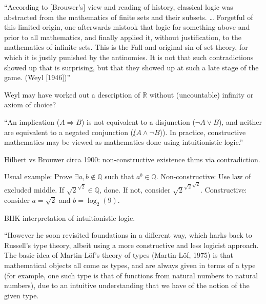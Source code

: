 ``According to [Brouwer’s] view and reading of history, 
classical logic was abstracted 
from the mathematics of finite sets and their subsets. \ldots 
Forgetful of this limited origin, 
one afterwards mistook that logic 
for something above and prior to all mathematics, 
and finally applied it, without justification, 
to the mathematics of infinite sets. 
This is the Fall and original sin of set theory, 
for which it is justly punished by the antinomies. 
It is not that such contradictions showed up that is surprising,
 but that they showed up at such a late stage of the game. 
 (Weyl [1946])''
 
Weyl may have worked out a description of
$\mathbb{R}$ without (uncountable) infinity or
axiom of choice?

\label{sec:Constructivism_IEP}
\cite{iep:Constructive_mathematics}

``An implication ($A \Rightarrow B$) is not equivalent 
to a disjunction ($\lnot A \vee B$), 
and neither are equivalent to a negated conjunction 
($\not (A \wedge \lnot B$)). 
In practice, constructive mathematics may be viewed 
as mathematics done using intuitionistic 
logic.''\cite{iep:Constructive_mathematics}

Hilbert vs Brouwer circa 1900: 
non-constructive existence thms via contradiction.

Usual example: Prove $\exists a,b \notin \mathbb{Q}$
such that $a^b \in \mathbb{Q}$. \hfill\break
Non-constructive: Use law of excluded middle.
If $\sqrt{2}^{\sqrt{2}} \in \mathbb{Q}$, done.
If not, consider ${\sqrt{2}^{\sqrt{2}}}^{\sqrt{2}}$.
\hfill\break
Constructive: consider $a=\sqrt{2}$ and $b=\log_2(9)$.

BHK interpretation of intuitionistic 
logic\cite{wiki:Brouwer_Heyting_Kolmogorov_interpretation}.

\label{sec:Martin_Lof_IEP}

``However he soon revisited foundations in a different way, 
which harks back to Russell's type theory, 
albeit using a more constructive and less logicist approach. 
The basic idea of Martin-Löf's theory of types (Martin-Löf, 1975) 
is
that mathematical objects all come as types, 
and are always given in terms of a
type (for example, one such type is that of functions 
from natural numbers to
natural numbers), due to an intuitive understanding 
that we have of the notion
of the given type.

